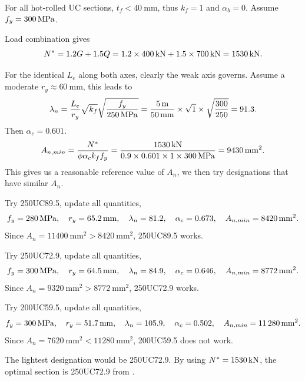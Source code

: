\begin{solution}
For all hot-rolled UC sections, $t_f<\SI{40}{\mm}$, thus $k_f=1$ and $\alpha_b=0$.
Assume $f_y=\SI{300}{\mega\pascal}$.

Load combination gives
\begin{gather*}
N^*=1.2G+1.5Q=1.2\times\SI{400}{\kilo\newton}+1.5\times\SI{700}{\kilo\newton}=\SI{1530}{\kilo\newton}.
\end{gather*}

For the identical $L_e$ along both axes, clearly the weak axis governs.
Assume a moderate $r_y\approx\SI{60}{\mm}$, this leads to
\begin{gather*}
\lambda_n=\dfrac{L_e}{r_y}\sqrt{k_f}\sqrt{\dfrac{f_y}{\SI{250}{\mega\pascal}}}=\dfrac{\SI{5}{\meter}}{\SI{50}{\milli\meter}}\times\sqrt{1}\times\sqrt{\dfrac{300}{250}}=91.3.
\end{gather*}
Then $\alpha_c=0.601$.
\begin{gather*}
A_{n,min}=\dfrac{N^*}{\phi\alpha_ck_ff_y}=\dfrac{\SI{1530}{\kilo\newton}}{0.9\times0.601\times1\times\SI{300}{\mega\pascal}}=\SI{9430}{\milli\meter^2}.
\end{gather*}
This gives us a reasonable reference value of $A_n$, we then try designations that have similar $A_n$.

Try 250UC89.5, update all quantities,
\begin{gather*}
f_y=\SI{280}{\mega\pascal},\quad
r_y=\SI{65.2}{\milli\meter},\quad
\lambda_n=81.2,\quad
\alpha_c=0.673,\quad
A_{n,min}=\SI{8420}{\milli\meter^2}.
\end{gather*}
Since $A_n=\SI{11400}{\mm^2}>\SI{8420}{\mm^2}$, 250UC89.5 works.

Try 250UC72.9, update all quantities,
\begin{gather*}
f_y=\SI{300}{\mega\pascal},\quad
r_y=\SI{64.5}{\milli\meter},\quad
\lambda_n=84.9,\quad
\alpha_c=0.646,\quad
A_{n,min}=\SI{8772}{\milli\meter^2}.
\end{gather*}
Since $A_n=\SI{9320}{\mm^2}>\SI{8772}{\mm^2}$, 250UC72.9 works.

Try 200UC59.5, update all quantities,
\begin{gather*}
f_y=\SI{300}{\mega\pascal},\quad
r_y=\SI{51.7}{\milli\meter},\quad
\lambda_n=105.9,\quad
\alpha_c=0.502,\quad
A_{n,min}=\SI{11280}{\milli\meter^2}.
\end{gather*}
Since $A_n=\SI{7620}{\mm^2}<\SI{11280}{\mm^2}$, 200UC59.5 does not work.

The lightest designation would be 250UC72.9.
By using $N^*=\SI{1530}{\kilo\newton}$, the optimal section is 250UC72.9 from .
\end{solution}

